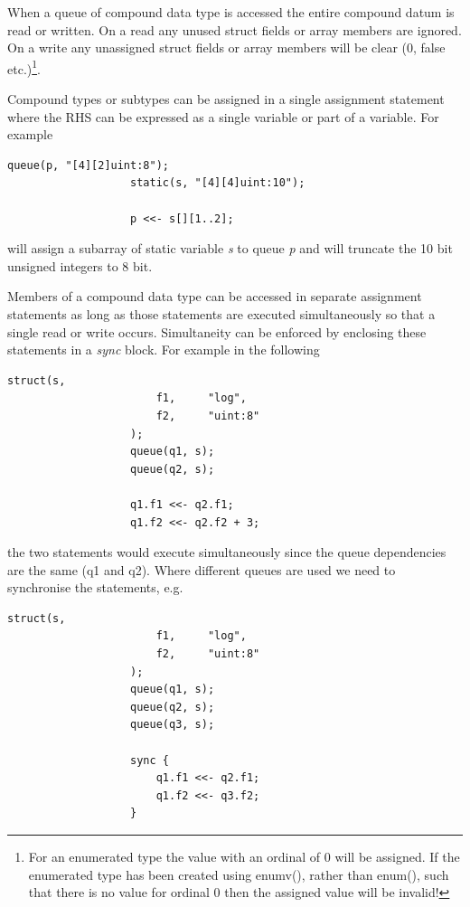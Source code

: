             When a queue of compound data type is accessed the entire compound
            datum is read or written. On a read any unused struct fields or
            array members are ignored. On a write any unassigned struct fields
            or array members will be clear (0, false etc.)\footnote{For an
            enumerated type the value with an ordinal of 0 will be assigned. If
            the enumerated type has been created using enumv(), rather than
            enum(), such that there is no value for ordinal 0 then the assigned
            value will be invalid!}.

            Compound types or subtypes can be assigned in a single assignment
            statement where the RHS can be expressed as a single variable or
            part of a variable. For example 
            \begin{lstlisting}[gobble=12, language=threepl]
                   queue(p, "[4][2]uint:8");
                   static(s, "[4][4]uint:10");

                   p <<- s[][1..2];
            \end{lstlisting}
            will assign a subarray of static variable {\em s} to queue {\em p}
            and will truncate the 10 bit unsigned integers to 8 bit.

            Members of a compound data type can be accessed in separate
            assignment statements as long as those statements are executed
            simultaneously so that a single read or write occurs. Simultaneity
            can be enforced by enclosing these statements in a {\em sync}
            block. For example in the following
            \begin{lstlisting}[gobble=12, language=threepl]
                   struct(s,
                       f1,     "log",
                       f2,     "uint:8"
                   );
                   queue(q1, s);
                   queue(q2, s);

                   q1.f1 <<- q2.f1;
                   q1.f2 <<- q2.f2 + 3;
            \end{lstlisting}
            the two statements would execute simultaneously since the queue
            dependencies are the same (q1 and q2). Where different queues are
            used we need to synchronise the statements, e.g.
            \begin{lstlisting}[gobble=12, language=threepl]
                   struct(s,
                       f1,     "log",
                       f2,     "uint:8"
                   );
                   queue(q1, s);
                   queue(q2, s);
                   queue(q3, s);

                   sync {
                       q1.f1 <<- q2.f1;
                       q1.f2 <<- q3.f2;
                   }
            \end{lstlisting}
            
